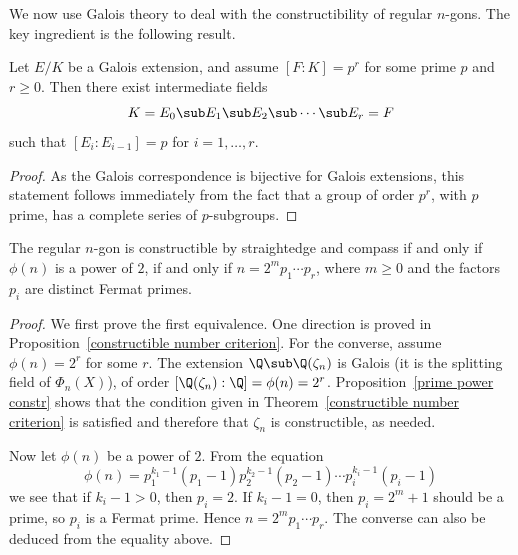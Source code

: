 We now use Galois theory to deal with the constructibility of regular $n$-gons. The key ingredient is the following result.
\begin{proposition}\label{prime power constr}
Let $E/K$ be a Galois extension, and assume $[F:K]=p^r$ for some prime $p$ and $r\geq 0$. Then there exist intermediate fields
\[K=E_0\sub E_1\sub E_2\sub\cdots\sub E_r=F\]
such that $[E_i:E_{i-1}]=p$ for $i=1,\dots,r$.
\end{proposition}
\begin{proof}
As the Galois correspondence is bijective for Galois extensions, this statement follows immediately from the fact that a group of order $p^r$, with $p$ prime, has a complete series of $p$-subgroups.
\end{proof}
\begin{theorem}\label{constructible regular n-gon iff}
The regular $n$-gon is constructible by straightedge and compass if and only if $\phi(n)$ is a power of $2$, if and only if $n=2^mp_1\cdots p_r$, where $m\geq 0$ and the factors $p_i$ are distinct Fermat primes.
\end{theorem}
\begin{proof}
We first prove the first equivalence. One direction is proved in Proposition~\ref{constructible number criterion}. For the converse, assume $\phi(n)=2^r$ for some $r$. The extension $\Q\sub\Q(\zeta_n)$ is Galois (it is the splitting field of $\Phi_n(X)$), of order $[\Q(\zeta_n):\Q]=\phi(n)=2^r$. Proposition~\ref{prime power constr} shows that the condition given in Theorem~\ref{constructible number criterion} is satisfied and therefore that $\zeta_n$ is constructible, as needed.\par
Now let $\phi(n)$ be a power of $2$. From the equation
\[\phi(n)=p_1^{k_1-1}(p_1-1)p_2^{k_2-1}(p_2-1)\cdots p_i^{k_i-1}(p_i-1)\]
we see that if $k_i-1>0$, then $p_i=2$. If $k_i-1=0$, then $p_i=2^m+1$ should be a prime, so $p_i$ is a Fermat prime. Hence $n=2^mp_1\cdots p_r$. The converse can also be deduced from the equality above.
\end{proof}
